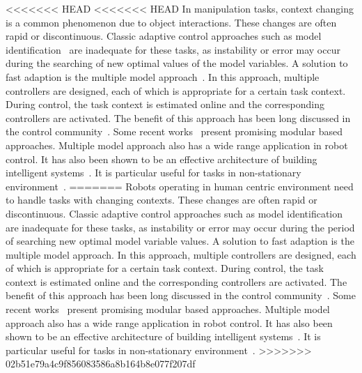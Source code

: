 <<<<<<< HEAD
<<<<<<< HEAD
In manipulation tasks, context changing is a common phenomenon due to object interactions. These changes are often rapid or discontinuous. Classic adaptive control approaches such as model identification~\cite{khalil2004modeling} are inadequate for these tasks, as instability or error may occur during the searching of new optimal values of the model variables. A solution to fast adaption is the multiple model approach~\cite{narendra1995adaptation}. In this approach, multiple controllers are designed, each of which is appropriate for a certain task context. During control, the task context is estimated online and the corresponding controllers are activated. The benefit of this approach has been long discussed in the control community~\cite{jacobs1991adaptive,narendra1997adaptive}. Some recent works~\cite{fekri2007robust,kuipers2010multiple} present promising modular based approaches. Multiple model approach also has a wide range application in robot control. It has also been shown to be an effective architecture of building intelligent systems~\cite{bryson2004modular,BrysonMcG12}. It is particular useful for tasks in  non-stationary environment~\cite{sugimoto2012emosaic}.
=======
Robots operating in human centric environment need to handle tasks with changing contexts. These changes are often rapid or discontinuous. Classic adaptive control approaches such as model identification~\cite{khalil2004modeling} are inadequate for these tasks, as instability or error may occur during the period of searching new optimal model variable values. A solution to fast adaption is the multiple model approach. In this approach, multiple controllers are designed, each of which is appropriate for a certain task context. During control, the task context is estimated online and the corresponding controllers are activated. The benefit of this approach has been long discussed in the control community~\cite{jacobs1991adaptive,narendra1995adaptation,narendra1997adaptive}. Some recent works~\cite{fekri2007robust,kuipers2010multiple} present promising modular based approaches. Multiple model approach also has a wide range application in robot control. It has also been shown to be an effective architecture of building intelligent systems~\cite{bryson2004modular,BrysonMcG12}. It is particular useful for tasks in  non-stationary environment~\cite{petkos2006learning,sugimoto2012emosaic}.
>>>>>>> 02b51e79a4c9f856083586a8b164b8e077f207df


